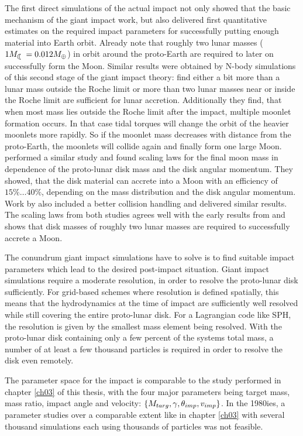 The first direct simulations \citep{Benz:1985p1755, Benz:1989p1893, Cameron:2000p1854} of the actual impact not only showed that the basic mechanism of the giant impact work, but also delivered first quantitative estimates on the required impact parameters for successfully putting enough material into Earth orbit. Already \cite{1975Icar...24..504H} note that roughly two lunar masses ($1 \ML = 0.012 \ME$) in orbit around the proto-Earth are required to later on successfully form the Moon. Similar results were obtained by N-body simulations of this second stage of the giant impact theory: \cite{Canup:1996p3541} find either a bit more than a lunar mass outside the Roche limit or more than two lunar masses near or inside the Roche limit are sufficient for lunar accretion. Additionally they find, that when most mass lies outside the Roche limit after the impact, multiple moonlet formation occurs. In that case tidal torques will change the orbit of the heavier moonlets more rapidly. So if the moonlet mass decreases with distance from the proto-Earth, the moonlets will collide again and finally form one large Moon. \citep{Ida:1997p3395} performed a similar study and found scaling laws for the final moon mass in dependence of the proto-lunar disk mass and the disk angular momentum. They showed, that the disk material can accrete into a Moon with an efficiency of $15 \% \dots 40 \%$, depending on the mass distribution and the disk angular momentum. Work by \citep{Kokubo:2000p2195} also included a better collision handling and delivered similar results. The scaling laws from both studies agrees well with the early results from \cite{Canup:1996p3541} and shows that disk masses of roughly two lunar masses are required to successfully accrete a Moon.

The conundrum giant impact simulations have to solve is to find suitable impact parameters which lead to the desired post-impact situation. Giant impact simulations require a moderate resolution, in order to resolve the proto-lunar disk sufficiently. For grid-based schemes where resolution is defined spatially, this means that the hydrodynamics at the time of impact are sufficiently well resolved while still covering the entire proto-lunar disk. For a Lagrangian code like SPH, the resolution is given by the smallest mass element being resolved. With the proto-lunar disk containing only a few percent of the systems total mass, a number of at least a few thousand particles is required in order to resolve the disk even remotely. 

The parameter space for the impact is comparable to the study performed in chapter \ref{ch03} of this thesis, with the four major parameters being target mass, mass ratio, impact angle and velocity: $\{M_{targ}, \gamma, \theta_{imp}, v_{imp}\}$. In the 1980ies, a parameter studies over a comparable extent like in chapter \ref{ch03}  with several thousand simulations each using thousands of particles was not feasible. 

